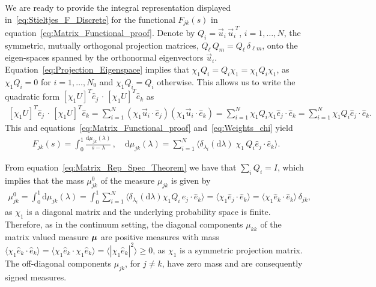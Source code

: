 \documentclass{cmslatex}
\renewcommand{\d}{\text{d}}
\newcommand\bmu{\mbox{\boldmath${\mu}$}}
\begin{document}
We are ready to provide the integral representation displayed
in~\eqref{eq:Stieltjes_F_Discrete} for the functional $F_{jk}(s)$ in 
equation~\eqref{eq:Matrix_Functional_proof}. Denote by
$Q_i=\vec{u}_i\,\vec{u}_i^{\;T}$, $i=1,\ldots,N$, the symmetric, mutually
orthogonal projection matrices, $Q_\ell\,Q_m=Q_\ell\,\delta_{\ell m}$, onto the eigen-spaces
spanned by the orthonormal eigenvectors
$\vec{u}_i$. Equation~\eqref{eq:Projection_Eigenspace} implies that 
$\chi_1Q_i=Q_i\chi_1=\chi_1Q_i\chi_1$, as $\chi_1Q_i=0$ for $i=1,\ldots,N_0$ and
$\chi_1Q_i=Q_i$ otherwise. This allows us to write the quadratic form
$[\chi_1U]^T\hat{e}_j\,\cdot\,[\chi_1U]^T\hat{e}_k$ as  
%
\begin{align}\label{eq:Quadratic_form}
  [\chi_1U]^T\hat{e}_j\,\cdot\,[\chi_1U]^T\hat{e}_k=\sum_{i=1}^N(\chi_1\vec{u}_i\cdot\hat{e}_j)
                                     (\chi_1\vec{u}_i\cdot\hat{e}_k)
                              =\sum_{i=1}^N \chi_1Q_i\chi_1\hat{e}_j\cdot\hat{e}_k
                              =\sum_{i=1}^N \chi_1Q_i\hat{e}_j\cdot\hat{e}_k.
\end{align}
%
This and equations~\eqref{eq:Matrix_Functional_proof}
and~\eqref{eq:Weights_chi} yield 
%
\begin{align}\label{eq:Stieltjes_F_DiscretE}
  F_{jk}(s)=\int_0^1\frac{\d\mu_{jk}(\lambda)}{s-\lambda}\,, \quad
  \d\mu_{jk}(\lambda)=\sum_{i=1}^N\langle \delta_{\lambda_i}(\d\lambda)\;\chi_1\,Q_i\hat{e}_j\cdot\hat{e}_k\rangle.
\end{align}
%



From equation~\eqref{eq:Matrix_Rep_Spec_Theorem} we have that
$\sum_iQ_i=I$, which implies that the mass $\mu^0_{jk}$ of the measure
$\mu_{jk}$ is given by
%
\begin{align}\label{eq:Measure_Mass_Lattice}
  \mu^0_{jk}=\int_0^1\d\mu_{jk}(\lambda)
       =\int_0^1\sum_{i=1}^N \langle\delta_{\lambda_i}(\d\lambda)\chi_1Q_i\,\hat{e}_j\cdot\hat{e}_k\rangle
       =\langle\chi_1\hat{e}_j\cdot\hat{e}_k\rangle
       =\langle\chi_1\hat{e}_k\cdot\hat{e}_k\rangle\,\delta_{jk},          
\end{align}
%
as $\chi_1$ is a diagonal matrix and the underlying probability space is
finite. Therefore, as in the continuum setting, the diagonal
components $\mu_{kk}$ of the matrix valued measure $\bmu$ are positive
measures with mass
$\langle\chi_1\hat{e}_k\cdot\hat{e}_k\rangle=\langle\chi_1\hat{e}_k\cdot\chi_1\hat{e}_k\rangle=\langle|\chi_1\hat{e}_k|^2\rangle\geq0$,
as $\chi_1$ is a symmetric projection matrix. The off-diagonal
components $\mu_{jk}$, for $j\neq k$, have zero mass and are consequently
signed measures.
\end{document}
